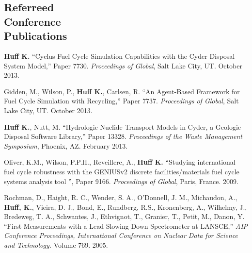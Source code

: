 \documentclass[margin,line]{resume}
\begin{document}
\begin{resume}
    \section{\mysidestyle Referreed\\Conference\\Publications}
    \begin{bibenum}
      \item \textbf{Huff K.} ``Cyclus Fuel Cycle Simulation Capabilities with the Cyder Disposal System Model,'' Paper 7730.
         \emph{Proceedings of Global}, Salt Lake City, UT. October 2013. 
      \item Gidden, M., Wilson, P., \textbf{Huff K.}, Carlsen, R. ``An Agent-Based Framework for Fuel Cycle Simulation with Recycling,'' Paper 7737.
         \emph{Proceedings of Global}, Salt Lake City, UT. October 2013. 
      \item \textbf{Huff K.}, Nutt, M. ``Hydrologic Nuclide Transport Models in Cyder, a Geologic Disposal Software Library,'' Paper 13328.
         \emph{Proceedings of the Waste Management Symposium}, Phoenix, AZ.  February 2013. 
      \item Oliver, K.M., Wilson, P.P.H., Reveillere, A., \textbf{Huff K.} ``Studying international fuel cycle robustness with the GENIUSv2 discrete 
          facilities/materials fuel cycle systems analysis tool	'', Paper 9166. 
          \emph{Proceedings of Global}, Paris, France. 2009.
      \item Rochman, D., Haight, R. C., Wender, S. A., O'Donnell, J. M., 
        Michaudon, A., \textbf{Huff, K.}, Vieira, D. J., Bond, E., Rundberg, R.S., 
        Kronenberg, A., Wilhelmy, J., Bredeweg, T. A., Schwantes, J., Ethvignot, T., 
        Granier, T., Petit, M., Danon, Y. 
        ``First Measurements with a Lead Slowing-Down Spectrometer at LANSCE,'' 
        \emph{AIP Conference Proceedings, International Conference on Nuclear 
        Data for Science and Technology.} Volume 769. 2005.
    \end{bibenum}

\end{resume}
\end{document}
